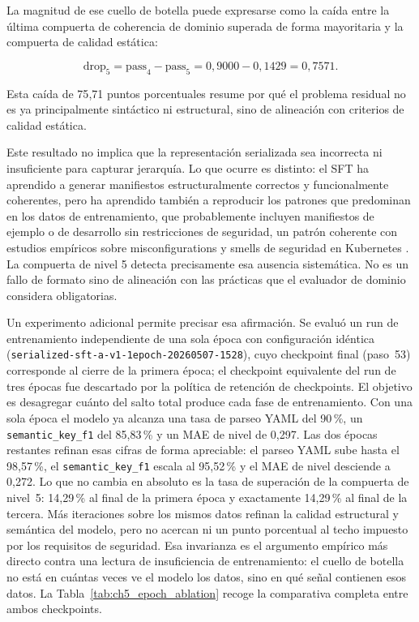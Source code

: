 La magnitud de ese cuello de botella puede expresarse como la caída entre la última compuerta de coherencia de dominio superada de forma mayoritaria y la compuerta de calidad estática:

\[
\mathrm{drop}_5 = \mathrm{pass}_4 - \mathrm{pass}_5
= 0{,}9000 - 0{,}1429 = 0{,}7571.
\]

Esta caída de 75{,}71 puntos porcentuales resume por qué el problema residual no es ya principalmente sintáctico ni estructural, sino de alineación con criterios de calidad estática.

Este resultado no implica que la representación serializada sea incorrecta ni insuficiente
para capturar jerarquía. Lo que ocurre es distinto: el SFT ha aprendido a generar manifiestos
estructuralmente correctos y funcionalmente coherentes, pero ha aprendido también a reproducir
los patrones que predominan en los datos de entrenamiento, que probablemente incluyen
manifiestos de ejemplo o de desarrollo sin restricciones de seguridad, un patrón coherente con estudios empíricos sobre misconfigurations y smells de seguridad en Kubernetes \citep{rahman2023securityk8s, zhang2024generativeSmells}. La compuerta de nivel 5
detecta precisamente esa ausencia sistemática. No es un fallo de formato sino de alineación
con las prácticas que el evaluador de dominio considera obligatorias.

Un experimento adicional permite precisar esa afirmación. Se evaluó un run de entrenamiento
independiente de una sola época con configuración idéntica
(\texttt{serialized-sft-a-v1-1epoch-}\allowbreak\texttt{20260507-1528}), cuyo checkpoint final (paso~53)
corresponde al cierre de la primera época; el checkpoint equivalente del run de tres épocas
fue descartado por la política de retención de checkpoints. El objetivo es desagregar cuánto
del salto total produce cada fase de entrenamiento. Con una sola época el modelo ya alcanza una tasa de
parseo YAML del 90\,\%, un \texttt{semantic\_key\_f1} del 85{,}83\,\% y un MAE de nivel de
0{,}297. Las dos épocas restantes refinan esas cifras de forma apreciable: el parseo YAML sube
hasta el 98{,}57\,\%, el \texttt{semantic\_key\_f1} escala al 95{,}52\,\% y el MAE de nivel
desciende a 0{,}272. Lo que no cambia en absoluto es la tasa de superación de la compuerta de
nivel~5: 14{,}29\,\% al final de la primera época y exactamente 14{,}29\,\% al final de la
tercera. Más iteraciones sobre los mismos datos refinan la calidad estructural y semántica del
modelo, pero no acercan ni un punto porcentual al techo impuesto por los requisitos de seguridad.
Esa invarianza es el argumento empírico más directo contra una lectura de insuficiencia de
entrenamiento: el cuello de botella no está en cuántas veces ve el modelo los datos, sino en
qué señal contienen esos datos. La Tabla~\ref{tab:ch5_epoch_ablation} recoge la comparativa
completa entre ambos checkpoints.

